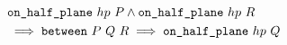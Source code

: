 \begin{equation}\label{eq:betOnHalfPlane2}
  \begin{split}
    &\texttt{on\_half\_plane}\ hp\ P \wedge \texttt{on\_half\_plane}\ hp\ R\\
    &\implies \texttt{between}\ P\ Q\ R \implies \texttt{on\_half\_plane}\ hp\ Q
  \end{split}
\end{equation}





